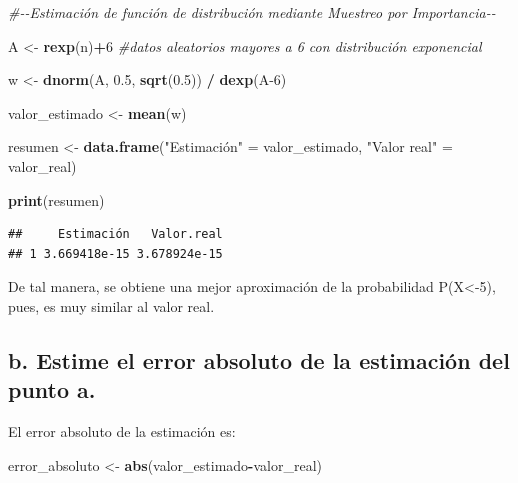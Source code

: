 \documentclass[
]{article}
\newenvironment{Shaded}{\begin{snugshade}}{\end{snugshade}}
\newcommand{\CommentTok}[1]{\textcolor[rgb]{0.56,0.35,0.01}{\textit{#1}}}
\newcommand{\DecValTok}[1]{\textcolor[rgb]{0.00,0.00,0.81}{#1}}
\newcommand{\FloatTok}[1]{\textcolor[rgb]{0.00,0.00,0.81}{#1}}
\newcommand{\FunctionTok}[1]{\textcolor[rgb]{0.13,0.29,0.53}{\textbf{#1}}}
\newcommand{\NormalTok}[1]{#1}
\newcommand{\OtherTok}[1]{\textcolor[rgb]{0.56,0.35,0.01}{#1}}
\newcommand{\SpecialCharTok}[1]{\textcolor[rgb]{0.81,0.36,0.00}{\textbf{#1}}}
\newcommand{\StringTok}[1]{\textcolor[rgb]{0.31,0.60,0.02}{#1}}
\begin{document}
\begin{Shaded}
\begin{Highlighting}[]
\CommentTok{\#{-}{-}Estimación de función de distribución mediante Muestreo por Importancia{-}{-}}

\NormalTok{A }\OtherTok{\textless{}{-}} \FunctionTok{rexp}\NormalTok{(n)}\SpecialCharTok{+}\DecValTok{6} \CommentTok{\#datos aleatorios mayores a 6 con distribución exponencial}

\NormalTok{w }\OtherTok{\textless{}{-}} \FunctionTok{dnorm}\NormalTok{(A, }\FloatTok{0.5}\NormalTok{, }\FunctionTok{sqrt}\NormalTok{(}\FloatTok{0.5}\NormalTok{)) }\SpecialCharTok{/} \FunctionTok{dexp}\NormalTok{(A}\DecValTok{{-}6}\NormalTok{)}

\NormalTok{valor\_estimado }\OtherTok{\textless{}{-}} \FunctionTok{mean}\NormalTok{(w)}

\NormalTok{resumen }\OtherTok{\textless{}{-}} \FunctionTok{data.frame}\NormalTok{(}\StringTok{"Estimación"} \OtherTok{=}\NormalTok{ valor\_estimado, }\StringTok{"Valor real"} \OtherTok{=}\NormalTok{ valor\_real)}

\FunctionTok{print}\NormalTok{(resumen)}
\end{Highlighting}
\end{Shaded}

\begin{verbatim}
##     Estimación   Valor.real
## 1 3.669418e-15 3.678924e-15
\end{verbatim}

De tal manera, se obtiene una mejor aproximación de la probabilidad
P(X\textless-5), pues, es muy similar al valor real.

\hypertarget{b.-estime-el-error-absoluto-de-la-estimaciuxf3n-del-punto-a.}{%
\subsection{b. Estime el error absoluto de la estimación del punto
a.}\label{b.-estime-el-error-absoluto-de-la-estimaciuxf3n-del-punto-a.}}

El error absoluto de la estimación es:

\begin{Shaded}
\begin{Highlighting}[]
\NormalTok{error\_absoluto }\OtherTok{\textless{}{-}} \FunctionTok{abs}\NormalTok{(valor\_estimado}\SpecialCharTok{{-}}\NormalTok{valor\_real)}
\end{Highlighting}
\end{Shaded}
\end{document}
